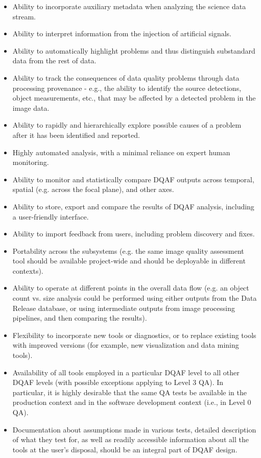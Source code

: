 \documentclass[SE,toc,lsstdraft]{lsstdoc}
\begin{document}
\begin{itemize}
\item Ability to incorporate auxiliary metadata when analyzing the science data stream.
\item Ability to interpret information from the injection of artificial signals.
\item Ability to automatically highlight problems and thus distinguish substandard data from the rest of data.
\item Ability to track the consequences of data quality problems through data processing provenance - e.g., the ability to identify the source detections, object measurements, etc., that may be affected by a detected problem in the image data.
\item Ability to rapidly and hierarchically explore possible causes of a problem after it has been identified and reported.
\item Highly automated analysis, with a minimal reliance on expert human monitoring.
\item Ability to monitor and statistically compare DQAF outputs across temporal, spatial (e.g. across the focal plane), and other axes.
\item Ability to store, export and compare the results of DQAF analysis, including a user-friendly interface.
\item Ability to import feedback from users, including problem discovery and fixes.
\item Portability across the subsystems (e.g. the same image quality assessment tool should be available
     project-wide and should be deployable in different contexts).
\item Ability to operate at different points in the overall data flow (e.g. an object count vs. size
         analysis could be performed using either outputs from the Data Release database, or
        using intermediate outputs from image processing pipelines, and then comparing the results).
\item Flexibility to incorporate new tools or diagnostics, or to replace existing tools with improved versions
        (for example, new visualization and data mining tools).
\item Availability of all tools employed in a particular DQAF level to all other DQAF levels (with
          possible exceptions applying to Level 3 QA). In particular, it is highly desirable that the same QA tests be available in the production context and in the software development context (i.e., in Level 0 QA).
\item Documentation about assumptions made in various tests, detailed description of what they test
         for, as well as readily accessible information about all the tools at the user's disposal, should
        be an integral part of DQAF design.
\end{itemize}
\end{document}

